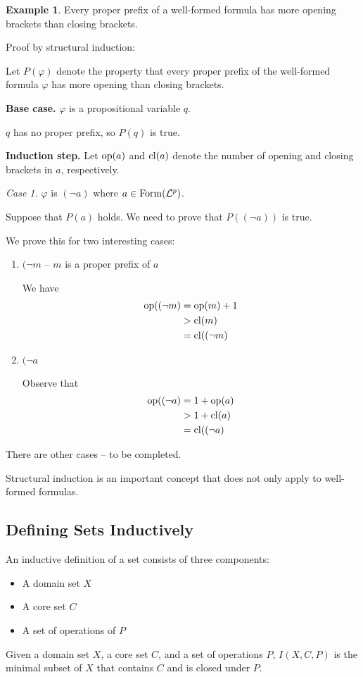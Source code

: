 \documentclass[11pt]{article}
\makeatletter
\theoremstyle{definition}
\newtheorem{exmp}[thm]{Example}
\newenvironment{pf}[1][\proofname]{\par
  \pushQED{\qed}%
  \normalfont \topsep0\p@\relax
  \trivlist
  \item[\hskip\labelsep\itshape
  #1\@addpunct{.}]\ignorespaces
}{%
  \popQED\endtrivlist\@endpefalse
}
\makeatother
\begin{document}
\begin{exmp} 
Every proper prefix of a well-formed formula has more opening brackets than closing brackets.
\end{exmp}
\begin{pf} 

Proof by structural induction:

Let $P(\varphi)$ denote the property that every proper prefix of the well-formed formula $\varphi$ has more opening than closing brackets. 

{\bf Base case.} $\varphi$ is a propositional variable $q$.

$q$ has no proper prefix, so $P(q)$ is true.

{\bf Induction step.} Let ${\rm op}(a)$ and ${\rm cl}(a)$ denote the number of opening and closing brackets in $a$, respectively.

{\it Case 1.} $\varphi$ is $(\neg a)$ where $a \in {\rm Form}(\mathcal{L}^p)$.

Suppose that $P(a)$ holds. We need to prove that $P((\neg a))$ is true.

We prove this for two interesting cases: \vspace{-0.25cm}
\begin{enumerate}[(1)]
\item $(\neg m$ -- $m$ is a proper prefix of $a$

We have
\begin{align*}
    {\rm op}((\neg m) 
    &= {\rm op}(m) + 1 \\
    &> {\rm cl}(m) \\
    &= {\rm cl}((\neg m)
\end{align*}

\item $(\neg a$

Observe that
\begin{align*}
    {\rm op}((\neg a) 
    &= 1 + {\rm op}(a) \\
    &> 1 + {\rm cl}(a) \\
    &= {\rm cl}((\neg a)
\end{align*}
\end{enumerate}
There are other cases -- to be completed.
\end{pf}

Structural induction is an important concept that does not only apply to well-formed formulas. 

\subsection{Defining Sets Inductively}
An inductive definition of a set consists of three components: \vspace{-0.25cm}
\begin{itemize}
    \item A domain set $X$
    \item A core set $C$
    \item A set of operations of $P$
\end{itemize}
\vspace{-0.25cm}
Given a domain set $X$, a core set $C$, and a set of operations $P$, $I(X, C, P)$ is the minimal subset of $X$ that contains $C$ and is closed under $P$.
\end{document}

